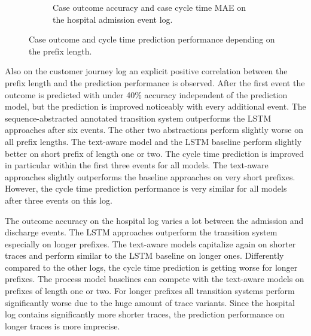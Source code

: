 \begin{figure}[!htbp]
\begin{subfigure}{\textwidth}
		\caption{Case outcome accuracy and case cycle time MAE on the hospital admission event log.}
	\end{subfigure}
	\caption[Case outcome and cycle time prediction performance depending on the prefix length]{Case outcome and cycle time prediction performance depending on the prefix length.}
	\label{fig:outcome-cycle-time-prefix}
\end{figure}


Also on the customer journey log an explicit positive correlation between the prefix length and the prediction performance is observed.
After the first event the outcome is predicted with under 40\% accuracy independent of the prediction model, but the prediction is improved noticeably with every additional event.
The sequence-abstracted annotated transition system outperforms the LSTM approaches after six events.
The other two abstractions perform slightly worse on all prefix lengths.
The text-aware model and the LSTM baseline perform slightly better on short prefix of length one or two.
The cycle time prediction is improved in particular within the first three events for all models.
The text-aware approaches slightly outperforms the baseline approaches on very short prefixes.
However, the cycle time prediction performance is very similar for all models after three events on this log.

The outcome accuracy on the hospital log varies a lot between the admission and discharge events.
The LSTM approaches outperform the transition system especially on longer prefixes.
The text-aware models capitalize again on shorter traces and perform similar to the LSTM baseline on longer ones.
Differently compared to the other logs, the cycle time prediction is getting worse for longer prefixes.
The process model baselines can compete with the text-aware models on prefixes of length one or two.
For longer prefixes all transition systems perform significantly worse due to the huge amount of trace variants.
Since the hospital log contains significantly more shorter traces, the prediction performance on longer traces is more imprecise.
 

